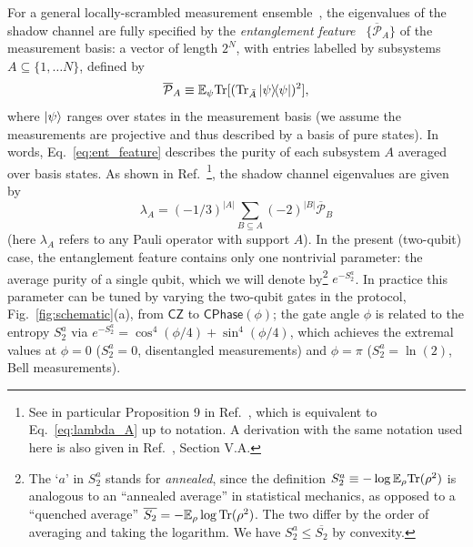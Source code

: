 \documentclass[a4paper,twocolumns,11pt,accepted=2024-03-04]{quantumarticle}
\newcommand{\CZ}{\ensuremath{\textsf{CZ}}}
\newcommand{\CPhase}[1]{\ensuremath{\textsf{CPhase}(#1)}}
\begin{document}
For a general locally-scrambled measurement ensemble~\cite{hu_classical_2023,akhtar_scalable_2023}, the eigenvalues of the shadow channel are fully specified by the 
{\it entanglement feature}~\cite{you_entanglement_2018,kuo_markovian_2020} $\{\overline{\mathcal P}_A\}$ of the measurement basis: a vector of length $2^N$, with entries labelled by subsystems $A \subseteq \{1,\dots N\}$, defined by
\begin{equation}
\overline{\mathcal P}_A \equiv \mathbb{E}_\psi {\rm Tr}[ ({\rm Tr}_{\bar A} \ketbra{\psi})^2],
\label{eq:ent_feature}
\end{equation}
where $\ket{\psi}$ ranges over states in the measurement basis (we assume the measurements are projective and thus described by a basis of pure states). In words, Eq.~\eqref{eq:ent_feature} describes the purity of each subsystem $A$ averaged over basis states.
%
As shown in Ref.~\cite{bu_classical_2022}\footnote{See in particular Proposition 9 in Ref.~\cite{bu_classical_2022}, which is equivalent to Eq.~\eqref{eq:lambda_A} up to notation. A derivation with the same notation used here is also given in Ref.~\cite{ippoliti_learnability_2023}, Section V.A.}, the shadow channel eigenvalues are given by
\begin{equation}
    \lambda_A = (-1/3)^{|A|} \sum_{B\subseteq A} (-2)^{|B|} \overline{\mathcal P}_B \label{eq:lambda_A}
\end{equation}
(here $\lambda_A$ refers to any Pauli operator with support $A$).
In the present (two-qubit) case, the entanglement feature contains only one nontrivial parameter: the average purity of a single qubit, which we will denote by\footnote{The `$a$' in $S_2^a$ stands for {\it annealed}, since the definition $S_2^a \equiv -\log \mathbb{E}_\rho {\rm Tr}(\rho^2)$ is analogous to an ``annealed average'' in statistical mechanics, as opposed to a ``quenched average'' $\overline{S_2} = -\mathbb{E}_\rho \log {\rm Tr}(\rho^2)$. The two differ by the order of averaging and taking the logarithm. We have $S_2^a \leq \overline{S_2}$ by convexity. } $e^{-S_2^a}$.
In practice this parameter can be tuned by varying the two-qubit gates in the protocol, Fig.~\ref{fig:schematic}(a), from $\CZ$ to $\CPhase{\phi}$; the gate angle $\phi$ is related to the entropy $S_2^a$ via $e^{-S_2^a} = \cos^4(\phi/4) + \sin^4(\phi/4)$, which achieves the extremal values at $\phi = 0$ ($S_2^a = 0$, disentangled measurements) and $\phi = \pi$ ($S_2^a = \ln(2)$, Bell measurements). 
\end{document}
